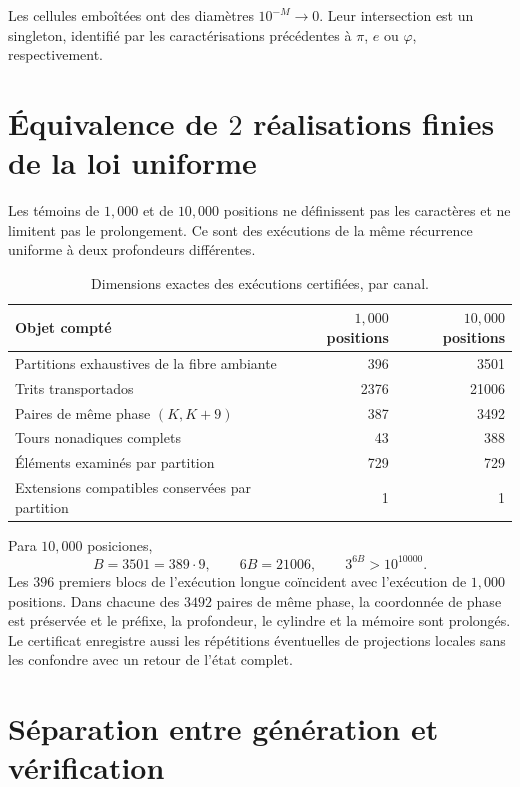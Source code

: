 \begin{corollary}
Les cellules emboîtées ont des diamètres \(10^{-M}\to0\). Leur intersection est
un singleton, identifié par les caractérisations précédentes à
\(\pi\), \(e\) ou \(\varphi\), respectivement.
\end{corollary}

\section{Équivalence de \(2\) réalisations finies de la loi uniforme}

Les témoins de \(1,000\) et de \(10,000\) positions ne définissent pas les
caractères et ne limitent pas le prolongement. Ce sont des exécutions de la même récurrence
uniforme à deux profondeurs différentes.

\begin{table}[htbp]
\centering
\caption{Dimensions exactes des exécutions certifiées, par canal.}
\label{gfp:b:tab:dimensiones-ejecuciones-1000-10000}
\begin{tabular}{lrr}
\toprule
Objet compté & \(1,000\) positions & \(10,000\) positions\\
\midrule
Partitions exhaustives de la fibre ambiante & 396 & 3501\\
Trits transportados & 2376 & 21006\\
Paires de même phase \((K,K+9)\) & 387 & 3492\\
Tours nonadiques complets & 43 & 388\\
Éléments examinés par partition & 729 & 729\\
Extensions compatibles conservées par partition & 1 & 1\\
\bottomrule
\end{tabular}
\end{table}

Para \(10,000\) posiciones,
\[
 B=3501=389\cdot9,
 \qquad
 6B=21006,
 \qquad
 3^{6B}>10^{10000}.
\]
Les \(396\) premiers blocs de l’exécution longue coïncident avec
l’exécution de \(1,000\) positions. Dans chacune des \(3492\) paires de
même phase, la coordonnée de phase est préservée et le préfixe, la
profondeur, le cylindre et la mémoire sont prolongés. Le certificat enregistre aussi les
répétitions éventuelles de projections locales sans les confondre avec un retour
de l’état complet.

\section{Séparation entre génération et vérification}

